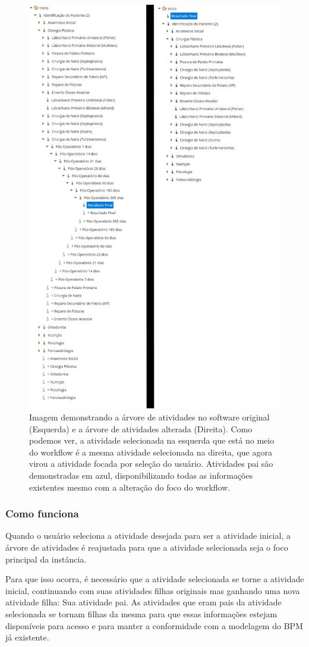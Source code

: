 \begin{figure}
    \centering
    \includegraphics[height=1\textwidth]{imgs/CENTRARE/arvoreNormalEAlterada.png}
    \caption{Imagem demonstrando a árvore de atividades no software original (Esquerda) e a árvore de atividades alterada (Direita). Como podemos ver, a atividade selecionada na esquerda que está no meio do workflow é a mesma atividade selecionada na direita, que agora virou a atividade focada por seleção do usuário. Atividades pai são demonstradas em azul, disponibilizando todas as informações existentes mesmo com a alteração do foco do workflow.}
    \label{fig:centrare_tree_normal_altered}
\end{figure}

\subsubsection{Como funciona}

Quando o usuário seleciona a atividade desejada para ser a atividade inicial, a árvore de atividades é reajustada para que a atividade selecionada seja o foco principal da instância.

Para que isso ocorra, é necessário que a atividade selecionada se torne a atividade inicial, continuando com suas atividades filhas originais mas ganhando uma nova atividade filha: Sua atividade pai. As atividades que eram pais da atividade selecionada se tornam filhas da mesma para que essas informações estejam disponíveis para acesso e para manter a conformidade com a modelagem do BPM já existente.

